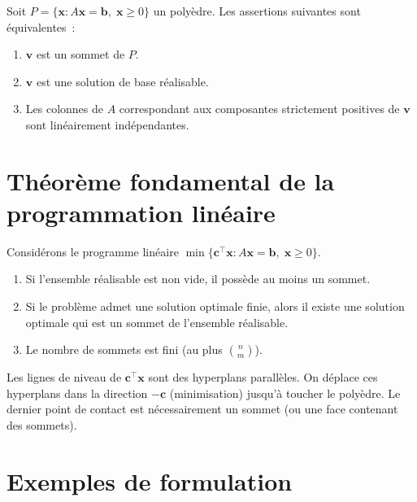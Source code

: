 \begin{theoreme}
\label{thm:sommet_sbr}
Soit $P = \{\mathbf{x} : A\mathbf{x} = \mathbf{b},\; \mathbf{x} \ge 0\}$
un poly\`edre.  Les assertions suivantes sont \'equivalentes~:
\begin{enumerate}
  \item $\mathbf{v}$ est un sommet de $P$.
  \item $\mathbf{v}$ est une solution de base r\'ealisable.
  \item Les colonnes de $A$ correspondant aux composantes strictement
        positives de $\mathbf{v}$ sont lin\'eairement ind\'ependantes.
\end{enumerate}
\end{theoreme}

\section{Th\'eor\`eme fondamental de la programmation lin\'eaire}

\begin{theoreme}
\label{thm:fondamental_pl}
Consid\'erons le programme lin\'eaire $\min\{\mathbf{c}^\top\mathbf{x} :
A\mathbf{x} = \mathbf{b},\; \mathbf{x} \ge 0\}$.
\begin{enumerate}
  \item Si l'ensemble r\'ealisable est non vide, il poss\`ede au moins un
        sommet.
  \item Si le probl\`eme admet une solution optimale finie, alors il existe une
        solution optimale qui est un sommet de l'ensemble r\'ealisable.
  \item Le nombre de sommets est fini (au plus $\binom{n}{m}$).
\end{enumerate}
\end{theoreme}

\begin{intuition}[title=\textbf{Pourquoi l'optimum est en un sommet~?}]
Les lignes de niveau de $\mathbf{c}^\top\mathbf{x}$ sont des hyperplans
parall\`eles.  On d\'eplace ces hyperplans dans la direction $-\mathbf{c}$
(minimisation) jusqu'\`a toucher le poly\`edre.  Le dernier point de contact
est n\'ecessairement un sommet (ou une face contenant des sommets).
\end{intuition}

\section{Exemples de formulation}

